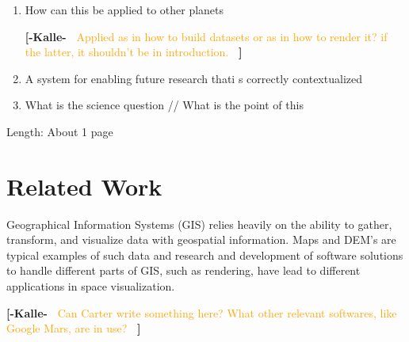 \documentclass[journal]{vgtc}                %
\newcommand{\kallecomment}[1]{\textbf{[-Kalle-~}
    \textcolor{orange}{#1}
    \textbf{~]}}
\begin{document}
\begin{enumerate}
\kallecomment{Mention latest coordinate system for Mars, IAU/IAG 2000 adoption.. Use of MOLA for correction etc.}

The highest resolution global color mosaic available for Mars today is still composed of images from the Viking missions.
The latest version, compiled by NASA AMES, is warped to match the latest grayscale MDIM 2.1 mosaic. 

The Mars Orbiter Laser Altimeter (MOLA) is an instrument on the Mars Global Surveyor (MGS) spacecraft.
The digital elevation model (DEM) assembled from MOLA data maps each position on the globe with an offset from the Areoid, Mars' reference ellipsoid, to an average accuracy of +-3 m (ref). The dataset has a resolution of 463.0836 meters/pixel.

\kallecomment{+-3 m sounds too good to be true? Should check the reference.}

\kallecomment{Areoid: geoid but for Mars. Areography, Martian geography.}




\kallecomment{Other datasets? Does ESA have Mars missions of interest?}

\item How can this be applied to other planets

\kallecomment{Applied as in how to build datasets or as in how to render it? if the latter, it shouldn't be in introduction.}

\item A system for enabling future research thati s correctly contextualized
\item What is the science question // What is the point of this
\end{enumerate}
Length: About 1 page

\section{Related Work} \label{sec:relatedwork}

Geographical Information Systems (GIS) relies heavily on the ability to gather, transform, and visualize data with geospatial information.
Maps and DEM's are typical examples of such data and research and development of software solutions to handle different parts of GIS, such as rendering, have lead to different applications in space visualization.

\kallecomment{Can Carter write something here? What other relevant softwares, like Google Mars, are in use?}
\end{document}

